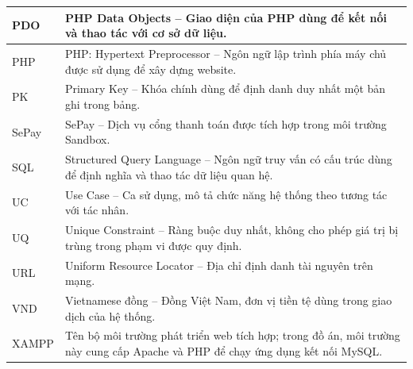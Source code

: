 {\begin{longtable}{|p{3cm}|p{\dimexpr\textwidth-3cm-4\tabcolsep-3\arrayrulewidth\relax}|}
    PDO & PHP Data Objects -- Giao diện của PHP dùng để kết nối và thao tác với cơ sở dữ liệu. \\ \hline
    PHP & PHP: Hypertext Preprocessor -- Ngôn ngữ lập trình phía máy chủ được sử dụng để xây dựng website. \\ \hline
    PK & Primary Key -- Khóa chính dùng để định danh duy nhất một bản ghi trong bảng. \\ \hline
    SePay & SePay -- Dịch vụ cổng thanh toán được tích hợp trong môi trường Sandbox. \\ \hline
    SQL & Structured Query Language -- Ngôn ngữ truy vấn có cấu trúc dùng để định nghĩa và thao tác dữ liệu quan hệ. \\ \hline
    UC & Use Case -- Ca sử dụng, mô tả chức năng hệ thống theo tương tác với tác nhân. \\ \hline
    UQ & Unique Constraint -- Ràng buộc duy nhất, không cho phép giá trị bị trùng trong phạm vi được quy định. \\ \hline
    URL & Uniform Resource Locator -- Địa chỉ định danh tài nguyên trên mạng. \\ \hline
    VND & Vietnamese đồng -- Đồng Việt Nam, đơn vị tiền tệ dùng trong giao dịch của hệ thống. \\ \hline
    XAMPP & Tên bộ môi trường phát triển web tích hợp; trong đồ án, môi trường này cung cấp Apache và PHP để chạy ứng dụng kết nối MySQL. \\ \hline
  \end{longtable}%
}
